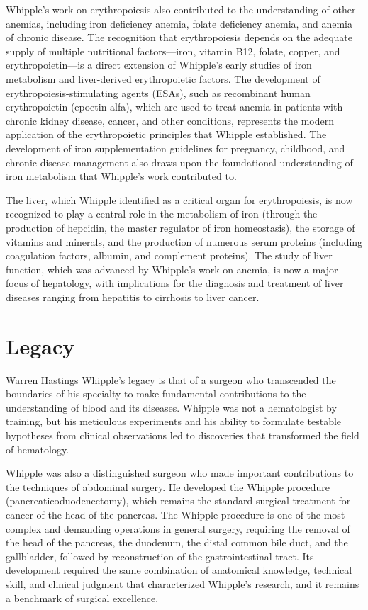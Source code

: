 Whipple's work on erythropoiesis also contributed to the understanding of other anemias, including iron deficiency anemia, folate deficiency anemia, and anemia of chronic disease. The recognition that erythropoiesis depends on the adequate supply of multiple nutritional factors---iron, vitamin B12, folate, copper, and erythropoietin---is a direct extension of Whipple's early studies of iron metabolism and liver-derived erythropoietic factors. The development of erythropoiesis-stimulating agents (ESAs), such as recombinant human erythropoietin (epoetin alfa), which are used to treat anemia in patients with chronic kidney disease, cancer, and other conditions, represents the modern application of the erythropoietic principles that Whipple established. The development of iron supplementation guidelines for pregnancy, childhood, and chronic disease management also draws upon the foundational understanding of iron metabolism that Whipple's work contributed to.

The liver, which Whipple identified as a critical organ for erythropoiesis, is now recognized to play a central role in the metabolism of iron (through the production of hepcidin, the master regulator of iron homeostasis), the storage of vitamins and minerals, and the production of numerous serum proteins (including coagulation factors, albumin, and complement proteins). The study of liver function, which was advanced by Whipple's work on anemia, is now a major focus of hepatology, with implications for the diagnosis and treatment of liver diseases ranging from hepatitis to cirrhosis to liver cancer.

\section{Legacy}

Warren Hastings Whipple's legacy is that of a surgeon who transcended the boundaries of his specialty to make fundamental contributions to the understanding of blood and its diseases. Whipple was not a hematologist by training, but his meticulous experiments and his ability to formulate testable hypotheses from clinical observations led to discoveries that transformed the field of hematology.

Whipple was also a distinguished surgeon who made important contributions to the techniques of abdominal surgery. He developed the Whipple procedure (pancreaticoduodenectomy), which remains the standard surgical treatment for cancer of the head of the pancreas. The Whipple procedure is one of the most complex and demanding operations in general surgery, requiring the removal of the head of the pancreas, the duodenum, the distal common bile duct, and the gallbladder, followed by reconstruction of the gastrointestinal tract. Its development required the same combination of anatomical knowledge, technical skill, and clinical judgment that characterized Whipple's research, and it remains a benchmark of surgical excellence.

